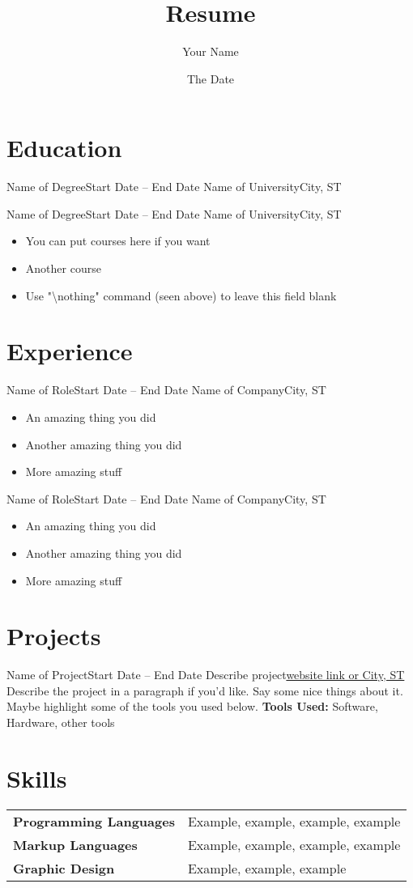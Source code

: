 \documentclass{article}
\title{Resume}
\author{Your Name}
\date{The Date}
\begin{document}
\sffamily %
\maketitle


\section{Education}

\entry
{Name of Degree}{Start Date -- End Date}
{Name of University}{City, ST}
{\nothing}

\entry
{Name of Degree}{Start Date -- End Date}
{Name of University}{City, ST}
{
\begin{itemize}
\item You can put courses here if you want
\item Another course
\item Use "\textbackslash nothing" command (seen above) to leave this field blank
\end{itemize}
}




\section{Experience}

\entry
{Name of Role}{Start Date -- End Date}
{Name of Company}{City, ST}
{
\begin{itemize}
\item An amazing thing you did
\item Another amazing thing you did
\item More amazing stuff
\end{itemize}
}


\entry
{Name of Role}{Start Date -- End Date}
{Name of Company}{City, ST}
{
\begin{itemize}
\item An amazing thing you did
\item Another amazing thing you did
\item More amazing stuff
\end{itemize}
}



\section{Projects}

\entry
{Name of Project}{Start Date -- End Date}
{Describe project}{\href{link_to_project.com}{website link or City, ST}}
{
Describe the project in a paragraph if you'd like.
Say some nice things about it.
Maybe highlight some of the tools you used below.
\textbf{Tools Used:} Software, Hardware, other tools
}


\section{Skills}

\begin{tabular}{ll}
\textbf{Programming Languages} & Example, example, example, example \\
\textbf{Markup Languages} & Example, example, example, example \\
\textbf{Graphic Design} & Example, example, example 
\end{tabular}
\end{document}
